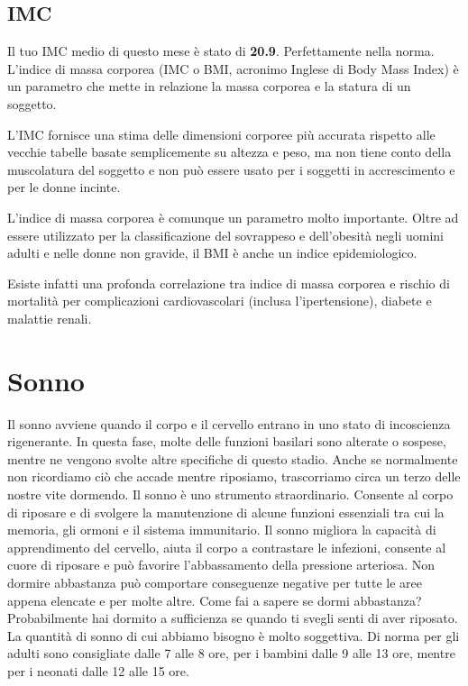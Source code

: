 \documentclass{article}
\begin{document}
\subsection{IMC}
Il tuo IMC medio di questo mese è stato di \textbf{20.9}. Perfettamente nella norma. L'indice di massa corporea (IMC o BMI, acronimo Inglese di Body Mass Index) è un parametro che mette in relazione la massa corporea e la statura di un soggetto.

L'IMC fornisce una stima delle dimensioni corporee più accurata rispetto alle vecchie tabelle basate semplicemente su altezza e peso, ma non tiene conto della muscolatura del soggetto e non può essere usato per i soggetti in accrescimento e per le donne incinte.

L'indice di massa corporea è comunque un parametro molto importante. Oltre ad essere utilizzato per la classificazione del sovrappeso e dell'obesità negli uomini adulti e nelle donne non gravide, il BMI è anche un indice epidemiologico.

Esiste infatti una profonda correlazione tra indice di massa corporea e rischio di mortalità per complicazioni cardiovascolari (inclusa l'ipertensione), diabete e malattie renali.

\section{Sonno}
Il sonno avviene quando il corpo e il cervello entrano in uno stato di incoscienza rigenerante.
In questa fase, molte delle funzioni basilari sono alterate o sospese, mentre ne vengono svolte altre specifiche di questo stadio. Anche se normalmente non ricordiamo ciò che accade mentre riposiamo, trascorriamo circa un terzo delle nostre vite dormendo.
Il sonno è uno strumento straordinario. Consente al corpo di riposare e di svolgere la manutenzione di alcune funzioni essenziali tra cui la memoria, gli ormoni e il sistema immunitario. Il sonno migliora la capacità di apprendimento del cervello, aiuta il corpo a contrastare le infezioni, consente al cuore di riposare e può favorire l'abbassamento della pressione arteriosa. Non dormire abbastanza può comportare conseguenze negative per tutte le aree appena elencate e per molte altre.
Come fai a sapere se dormi abbastanza?
Probabilmente hai dormito a sufficienza se quando ti svegli senti di aver riposato. La quantità di sonno di cui abbiamo bisogno è molto soggettiva. Di norma per gli adulti sono consigliate dalle 7 alle 8 ore, per i bambini dalle 9 alle 13 ore, mentre per i neonati dalle 12 alle 15 ore.
\end{document}
